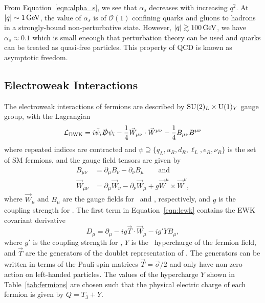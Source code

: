 From Equation~\ref{eqn:alpha_s}, we see that $\alpha_s$ decreases with increasing $q^2$.
At $\lvert q \rvert \sim 1\,\text{Ge\hspace{-.08em}V}$, the value of $\alpha_s$ is of $\mathcal{O}(1)$ confining quarks and gluons to hadrons in a strongly-bound non-perturbative state.
However, $\lvert q \rvert \gtrsim 100\,\text{Ge\hspace{-.08em}V}$, we have $\alpha_s \approx 0.1$ which is small eneough that perturbation theory can be used and quarks can be treated as quasi-free particles.
This property of QCD is known as asymptotic freedom.

\subsection{Electroweak Interactions}
\label{subsec:ewk}

The electroweak interactions of fermions are described by $\text{SU}(2)_L \times \text{U}(1)_Y$ gauge group, with the Lagrangian
\begin{equation}
  \label{eqn:lewk}
  \mathcal{L}_{\text{EWK}} = i \bar \psi_i \slashed D \psi_i - \frac{1}{4} \vec W_{\mu\nu} \cdot \vec W^{\mu\nu} - \frac{1}{4} B_{\mu\nu} B^{\mu\nu}
\end{equation}
where repeated indices are contracted and $\psi \supseteq \{q_L, u_R, d_R, \ell_L, e_R, \nu_R\}$ is the set of SM fermions, and the gauge field tensors are given by
\begin{align}
  B_{\mu\nu} & = \partial_\mu B_\nu - \partial_\nu B_\mu \qquad \text{and} \nonumber \\
  \vec W_{\mu\nu} & = \partial_\mu \vec W_\nu - \partial_\nu \vec W_\mu + g \vec W^\mu \times \vec W^\nu ,
\end{align}
where $\vec W_\mu$ and $B_\mu$ are the gauge fields for \sutwo\ and \uone, respectively, and $g$ is the coupling strength for \sutwo.
The first term in Equation~\ref{eqn:lewk} contains the EWK covariant derivative
\begin{equation}
  D_{\mu} = \partial_\mu - i g \vec T \cdot \vec W_\mu - i g' Y B_\mu,
\end{equation}
where $g'$ is the coupling strength for \uone,
$Y$ is the \uone\ hypercharge of the fermion field,
and $\vec T$ are the generators of the doublet representation of \sutwo.
The generators can be written in terms of the Pauli spin matrices $\vec T = \vec \sigma / 2$ and only have non-zero action on left-handed particles. %
The values of the hypercharge $Y$ shown in Table~\ref{tab:fermions} are chosen such that the physical electric charge of each fermion is given by $Q =  T_3 + Y$.

